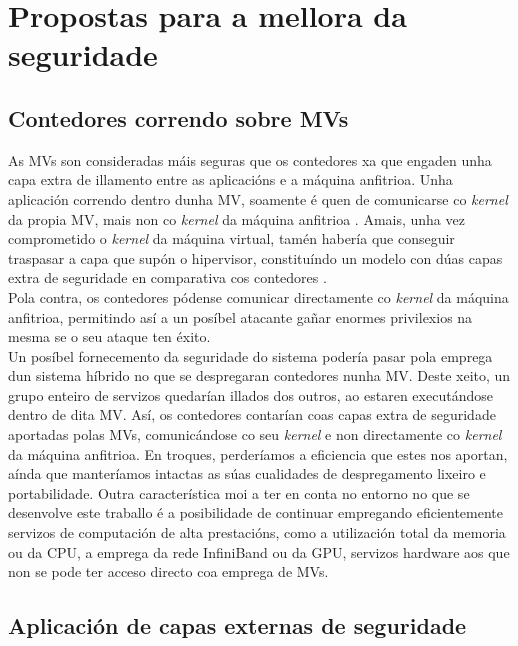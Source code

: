 \chapter{Propostas para a mellora da seguridade}
\minitoc
\clearpage

\section{Contedores correndo sobre \gls{MV}s}

As \gls{MV}s son consideradas máis seguras que os contedores xa que engaden unha capa extra de illamento entre as aplicacións e a máquina anfitrioa. Unha aplicación correndo dentro dunha \gls{MV}, soamente é quen de comunicarse co \textit{kernel} da propia \gls{MV}, mais non co \textit{kernel} da máquina anfitrioa \cite{Securing-Docker-Containers-from-Denial-of-Service}. Amais, unha vez comprometido o \textit{kernel} da máquina virtual, tamén habería que conseguir traspasar a capa que supón o hipervisor, constituíndo un modelo con dúas capas extra de seguridade en comparativa cos contedores \cite{state-of-art-docker-security}.\\

Pola contra, os contedores pódense comunicar directamente co \textit{kernel} da máquina anfitrioa, permitindo así a un posíbel atacante gañar enormes privilexios na mesma se o seu ataque ten éxito.\\

Un posíbel fornecemento da seguridade do sistema podería pasar pola emprega dun sistema híbrido no que se despregaran contedores nunha \gls{MV}. Deste xeito, un grupo enteiro de servizos quedarían illados dos outros, ao estaren executándose dentro de dita \gls{MV}. Así, os contedores contarían coas capas extra de seguridade aportadas polas \gls{MV}s, comunicándose co seu \textit{kernel} e non directamente co \textit{kernel} da máquina anfitrioa. En troques, perderíamos a eficiencia que estes nos aportan, aínda que manteríamos intactas as súas cualidades de despregamento lixeiro e portabilidade. Outra característica moi a ter en conta no entorno no que se desenvolve este traballo é a posibilidade de continuar empregando eficientemente servizos de computación de alta prestacións, como a utilización total da memoria ou da CPU, a emprega da rede InfiniBand ou da GPU, servizos hardware aos que non se pode ter acceso directo coa emprega de \gls{MV}s.

\section{Aplicación de capas externas de seguridade}


